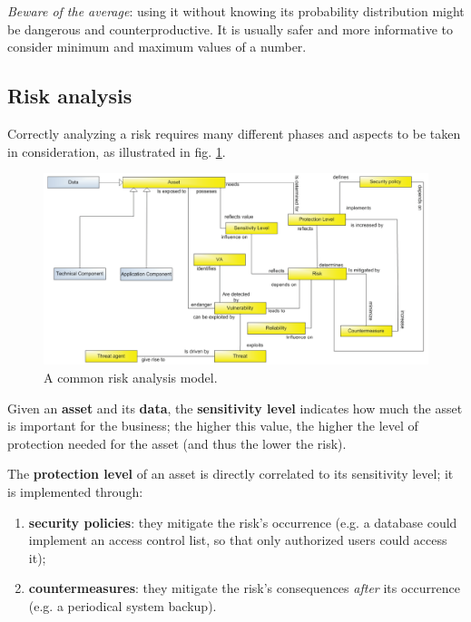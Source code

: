 \emph{Beware of the average}: using it without knowing its probability distribution might be dangerous and counterproductive. It is usually safer and more informative to consider minimum and maximum values of a number.


\subsection{Risk analysis}

Correctly analyzing a risk requires many different phases and aspects to be taken in consideration, as illustrated in fig. \ref{fig:riskmodel}.

\begin{figure}[H]
\centering
\includegraphics[scale=0.33]{img/risk_analysis.png}
\decoRule
\caption{A common risk analysis model.}
\label{fig:riskmodel}
\end{figure}

Given an \textbf{asset} and its \textbf{data}, the \textbf{sensitivity level} indicates how much the asset is important for the business; the higher this value, the higher the level of protection needed for the asset (and thus the lower the risk).

The \textbf{protection level} of an asset is directly correlated to its sensitivity level; it is implemented through:

\begin{enumerate}
    \item \textbf{security policies}: they mitigate the risk's occurrence (e.g. a database could implement an access control list, so that only authorized users could access it);
    \item \textbf{countermeasures}: they mitigate the risk's consequences \textit{after} its occurrence (e.g. a periodical system backup).
\end{enumerate}


